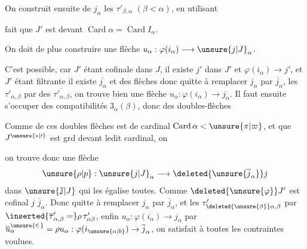 On construit ensuite de \unsure{$=$} $j_\alpha$   les $\tau'_{\beta,\alpha}$ $(\beta<\alpha)$, en utilisant 

fait que $J'$ est  devant  $\operatorname{Card}\alpha=\operatorname{Card} I_\alpha$.

On doit de plus construire une flèche $u_\alpha:\varphi(i_\alpha)\longrightarrow\unsure{j|J}_\alpha$.

 C'est possible, car  $J'$ étant cofinale dans $J$, il existe $j'$ dans $J'$ et $\varphi(i_\alpha)\longrightarrow j'$, et $J'$ étant filtrante il existe $\overline{j_\alpha}$ et des flèches
donc quitte à remplacer $j_\alpha$ par $\overline{j}_\alpha$, les $\tau'_{\alpha,\beta}$ par des $\overline{\tau'_{\alpha,\beta}}$, on trouve bien une flèche  $u_\alpha:\varphi(i_\alpha)\longrightarrow j_\alpha$. Il faut ensuite  s'occuper des compatibilités $3_\alpha(\beta)$,  donc des  doubles-flèches

Comme  de ces doubles flèches est de cardinal $\operatorname{Card}\alpha<\unsure{\pi|\varpi}$, et que $J^{\unsure{*|\prime}}$ est grd devant ledit cardinal, on

on trouve donc une flèche
\[
\unsure{\rho|p}:\unsure{j|J}_\alpha\longrightarrow\deleted{\unsure{\overline{j}_\alpha}}j
\]
dans $\unsure{\mathbb{J}|J}$ qui les égalise toutes. Comme $\deleted{\unsure{\varphi}}J'$ est cofinal  $j$   $\overline{j}_\alpha$. Donc quitte
à remplacer $j_\alpha$ par $\overline{j}_\alpha$, et  les $\tau'_{\deleted{\unsure{\beta}}\alpha,\beta}$ par $\inserted{\overline{\tau}'_{\alpha,\beta}=}\rho\,\tau'_{\alpha\beta}$, enfin $u_\alpha:\varphi(i_\alpha)\to j_\alpha$ par $\overline{u}^{\unsure{\prime|\,}}_\alpha=\rho u_\alpha:\varphi(i_{\unsure{\alpha|b}})\to\overline{j}_\alpha$, on satisfait à toutes les contraintes voulues.

